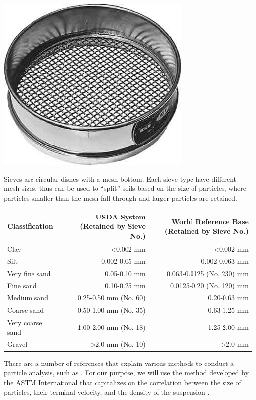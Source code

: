 \documentclass{tufte-handout}
\begin{document}
\begin{marginfigure}
	\includegraphics{8stainless_sieve.jpg}
	\caption{Sieves are circular dishes with a mesh bottom. Each sieve type have different mesh sizes, thus can be used to ``split'' soils based on the size of particles, where particles smaller than the mesh fall through and larger particles are retained.}
	\label{fig:8stainless_sieve}
\end{marginfigure}

\begin{table}
		\begin{tabular}{lrr}\hline
Classification 					&  USDA System (Retained by Sieve No.) 		& World Reference Base (Retained by Sieve No.)\\ \hline\hline
			Clay 							& <0.002 mm 							& <0.002 mm \\
			Silt 							& 0.002-0.05 mm 					& 0.002-0.063 mm\\
			Very fine sand		& 0.05-0.10 mm						& 0.063-0.0125 (No. 230) mm\\
			Fine sand 				& 0.10-0.25 mm 						& 0.0125-0.20 (No. 120) mm\\
			Medium sand				& 0.25-0.50 mm (No. 60) 	& 0.20-0.63 mm\\
			Coarse sand 			& 0.50-1.00 mm (No. 35) 	& 0.63-1.25 mm\\
			Very coarse sand	& 1.00-2.00 mm (No. 18)		& 1.25-2.00 mm\\
			Gravel 						& >2.0 mm (No. 10)				& >2.0 mm \\ \hline
		\end{tabular}
\end{table}


There are a number of references that explain various methods to conduct a particle analysis, such as \citep{gee1986particle, day1965particle, beretta2014soil}. For our purpose, we will use the method developed by the ASTM International that capitalizes on the correlation between the size of particles, their terminal velocity, and the density of the suspension \citep{standard2007d422}. 
\end{document}
